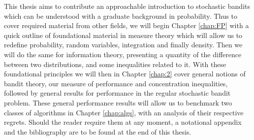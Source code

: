 \par This thesis aims to contribute an approachable introduction to stochastic bandits which can be understood with a graduate background in probability. Thus to cover required material from other fields, we will begin Chapter \ref{chap:FP} with a quick outline of foundational material in measure theory which will allow us to redefine probability, random variables, integration and finally density. Then we will do the same for information theory, presenting a quantity of the difference between two distributions, and some inequalities related to it. With these foundational principles we will then in Chapter \ref{chap:2} cover general notions of bandit theory, our measure of performance and concentration inequalities, followed by general results for performance in the regular stochastic bandit problem. These general performance results will allow us to benchmark two classes of algorithms in Chapter \ref{chap:algs}, with an analysis of their respective regrets.  Should the reader require them at any moment, a notational appendix and the bibliography are to be found at the end of this thesis. 
















